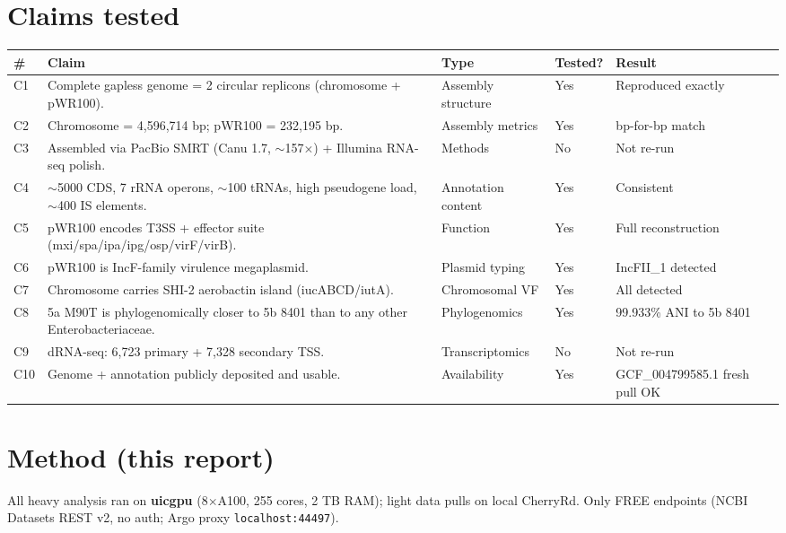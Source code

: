 \documentclass[11pt]{article}
\begin{document}
\section{Claims tested}

\begin{longtable}{@{}p{0.4cm}p{7cm}p{2.6cm}p{1.5cm}p{2.6cm}@{}}
\toprule
\# & Claim & Type & Tested? & Result \\
\midrule
\endhead
C1 & Complete gapless genome = 2 circular replicons (chromosome + pWR100). & Assembly structure & Yes & Reproduced exactly \\
C2 & Chromosome = 4{,}596{,}714 bp; pWR100 = 232{,}195 bp. & Assembly metrics & Yes & bp-for-bp match \\
C3 & Assembled via PacBio SMRT (Canu 1.7, $\sim$157$\times$) + Illumina RNA-seq polish. & Methods & No & Not re-run \\
C4 & $\sim$5000 CDS, 7 rRNA operons, $\sim$100 tRNAs, high pseudogene load, $\sim$400 IS elements. & Annotation content & Yes & Consistent \\
C5 & pWR100 encodes T3SS + effector suite (mxi/spa/ipa/ipg/osp/virF/virB). & Function & Yes & Full reconstruction \\
C6 & pWR100 is IncF-family virulence megaplasmid. & Plasmid typing & Yes & IncFII\_1 detected \\
C7 & Chromosome carries SHI-2 aerobactin island (iucABCD/iutA). & Chromosomal VF & Yes & All detected \\
C8 & 5a M90T is phylogenomically closer to 5b 8401 than to any other Enterobacteriaceae. & Phylogenomics & Yes & 99.933\% ANI to 5b 8401 \\
C9 & dRNA-seq: 6{,}723 primary + 7{,}328 secondary TSS. & Transcriptomics & No & Not re-run \\
C10 & Genome + annotation publicly deposited and usable. & Availability & Yes & GCF\_004799585.1 fresh pull OK \\
\bottomrule
\end{longtable}

\section{Method (this report)}

All heavy analysis ran on \textbf{uicgpu} (8$\times$A100, 255 cores, 2 TB RAM); light data pulls
on local CherryRd. Only FREE endpoints (NCBI Datasets REST v2, no auth; Argo proxy
\texttt{localhost:44497}).
\end{document}
